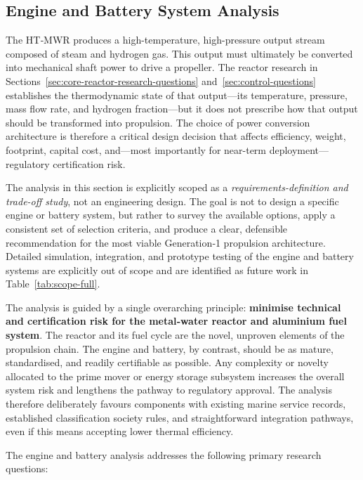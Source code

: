 \documentclass[12pt]{article}
\begin{document}
\break

\subsection{Engine and Battery System Analysis}
\label{sec:engine-battery-questions}

The HT‑MWR produces a high-temperature, high-pressure output stream composed of steam and hydrogen gas. This output must ultimately be converted into mechanical shaft power to drive a propeller. The reactor research in Sections~\ref{sec:core-reactor-research-questions} and~\ref{sec:control-questions} establishes the thermodynamic state of that output---its temperature, pressure, mass flow rate, and hydrogen fraction---but it does not prescribe how that output should be transformed into propulsion. The choice of power conversion architecture is therefore a critical design decision that affects efficiency, weight, footprint, capital cost, and---most importantly for near-term deployment---regulatory certification risk.

The analysis in this section is explicitly scoped as a \emph{requirements-definition and trade-off study}, not an engineering design. The goal is not to design a specific engine or battery system, but rather to survey the available options, apply a consistent set of selection criteria, and produce a clear, defensible recommendation for the most viable Generation‑1 propulsion architecture. Detailed simulation, integration, and prototype testing of the engine and battery systems are explicitly out of scope and are identified as future work in Table~\ref{tab:scope-full}.

The analysis is guided by a single overarching principle: \textbf{minimise technical and certification risk for the metal‑water reactor and aluminium fuel system}. The reactor and its fuel cycle are the novel, unproven elements of the propulsion chain. The engine and battery, by contrast, should be as mature, standardised, and readily certifiable as possible. Any complexity or novelty allocated to the prime mover or energy storage subsystem increases the overall system risk and lengthens the pathway to regulatory approval. The analysis therefore deliberately favours components with existing marine service records, established classification society rules, and straightforward integration pathways, even if this means accepting lower thermal efficiency.

The engine and battery analysis addresses the following primary research questions:
\end{document}
